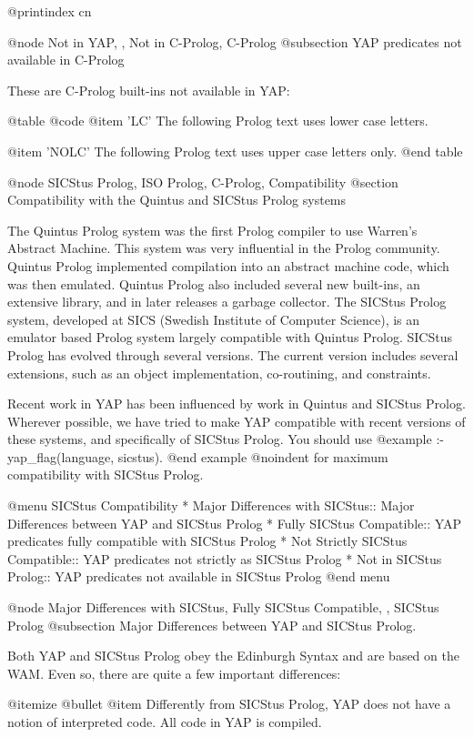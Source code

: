{{{{{{{{{@printindex cn

@node Not in YAP, , Not in C-Prolog, C-Prolog
@subsection YAP predicates not available in C-Prolog

These are C-Prolog built-ins not available in YAP:

@table @code
@item 'LC'
The following Prolog text uses lower case letters.

@item 'NOLC'
The following Prolog text uses upper case letters only.
@end table

@node SICStus Prolog, ISO Prolog, C-Prolog, Compatibility
@section Compatibility with the Quintus and SICStus Prolog systems

The Quintus Prolog system was the first Prolog compiler to use Warren's
Abstract Machine. This system was very influential in the Prolog
community. Quintus Prolog implemented compilation into an abstract
machine code, which was then emulated. Quintus Prolog also included
several new built-ins, an extensive library, and in later releases a
garbage collector. The SICStus Prolog system, developed at SICS (Swedish
Institute of Computer Science), is an emulator based Prolog system
largely compatible with Quintus Prolog. SICStus Prolog has evolved
through several versions. The current version includes several
extensions, such as an object implementation, co-routining, and
constraints.

Recent work in YAP has been influenced by work in Quintus and
SICStus Prolog. Wherever possible, we have tried to make YAP
compatible with recent versions of these systems, and specifically of
SICStus Prolog. You should use 
@example
:- yap_flag(language, sicstus).
@end example
@noindent
for maximum compatibility with SICStus Prolog.

@menu
SICStus Compatibility
* Major Differences with SICStus:: Major Differences between YAP and SICStus Prolog
* Fully SICStus Compatible:: YAP predicates fully compatible with
SICStus Prolog
* Not Strictly SICStus Compatible:: YAP predicates not strictly as
SICStus Prolog
* Not in SICStus Prolog:: YAP predicates not available in SICStus Prolog
@end menu

@node Major Differences with SICStus, Fully SICStus Compatible, , SICStus Prolog
@subsection Major Differences between YAP and SICStus Prolog.

Both YAP and SICStus Prolog obey the Edinburgh Syntax and are based on
the WAM. Even so, there are quite a few important differences:

@itemize @bullet
@item Differently from SICStus Prolog, YAP does not have a
notion of interpreted code. All code in YAP is compiled.

}}}}}}}}}
